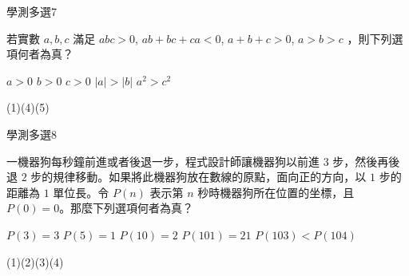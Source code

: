     \begin{QUESTION}
        \begin{ExamInfo}{91}{學測}{多選}{7}
        \end{ExamInfo}
        \begin{ExamAnsRateInfo}{75}{93}{82}{50}
        \end{ExamAnsRateInfo}
        \begin{QBODY}
            若實數 $a,b,c$ 滿足 $abc>0$, $ab+bc+ca<0$, $a+b+c>0$, $a>b>c$ ，則下列選項何者為真？ 
            \begin{QOPS} 
                \QOP $a>0$ 
                \QOP $b>0$ 
                \QOP $c>0$
                \QOP $|a|>|b|$ 
                \QOP $a^2>c^2$
            \end{QOPS}
        \end{QBODY}
        \begin{QFROMS}
        \end{QFROMS}
        \begin{QTAGS}\end{QTAGS}
        \begin{QANS}
            (1)(4)(5)
        \end{QANS}
        \begin{QSOLLIST}
        \end{QSOLLIST}
        \begin{QEMPTYSPACE}
        \end{QEMPTYSPACE}
    \end{QUESTION}
    \begin{QUESTION}
        \begin{ExamInfo}{91}{學測}{多選}{8}
        \end{ExamInfo}
        \begin{ExamAnsRateInfo}{60}{88}{64}{28}
        \end{ExamAnsRateInfo}
        \begin{QBODY}
            一機器狗每秒鐘前進或者後退一步，程式設計師讓機器狗以前進 $3$ 步，然後再後退 $2$ 步的規律移動。如果將此機器狗放在數線的原點，面向正的方向，以 $1$ 步的距離為 $1$ 單位長。令 $P(n)$ 表示第 $n$ 秒時機器狗所在位置的坐標，且 $P(0)=0$。那麼下列選項何者為真？ 
            \begin{QOPS}
                \QOP $P(3)=3$ 
                \QOP $P(5)=1$ 
                \QOP $P(10)=2$
                \QOP $P(101)=21$ 
                \QOP $P(103)<P(104)$
            \end{QOPS}
        \end{QBODY}
        \begin{QFROMS}
        \end{QFROMS}
        \begin{QTAGS}\end{QTAGS}
        \begin{QANS}
            (1)(2)(3)(4)
        \end{QANS}
        \begin{QSOLLIST}
        \end{QSOLLIST}
        \begin{QEMPTYSPACE}
        \end{QEMPTYSPACE}
    \end{QUESTION}

